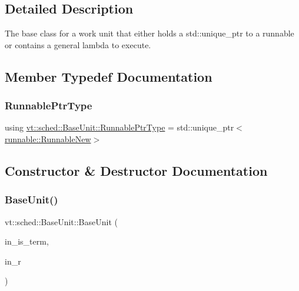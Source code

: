 \subsection{Detailed Description}
The base class for a work unit that either holds a {\ttfamily std\+::unique\+\_\+ptr} to a runnable or contains a general lambda to execute. 

\subsection{Member Typedef Documentation}
\mbox{\label{structvt_1_1sched_1_1_base_unit_a9be5d5adaeb011c8ef82f751485ebf9a}} 
\subsubsection{\texorpdfstring{Runnable\+Ptr\+Type}{RunnablePtrType}}
{\footnotesize\ttfamily using \hyperlink{structvt_1_1sched_1_1_base_unit_a9be5d5adaeb011c8ef82f751485ebf9a}{vt\+::sched\+::\+Base\+Unit\+::\+Runnable\+Ptr\+Type} =  std\+::unique\+\_\+ptr$<$\hyperlink{structvt_1_1runnable_1_1_runnable_new}{runnable\+::\+Runnable\+New}$>$}



\subsection{Constructor \& Destructor Documentation}
\mbox{\label{structvt_1_1sched_1_1_base_unit_a4223dce0bcccbb989eb49106d2e37abe}} 
\subsubsection{\texorpdfstring{Base\+Unit()}{BaseUnit()}\hspace{0.1cm}{\footnotesize\ttfamily [1/2]}}
{\footnotesize\ttfamily vt\+::sched\+::\+Base\+Unit\+::\+Base\+Unit (\begin{DoxyParamCaption}\item[{bool}]{in\+\_\+is\+\_\+term,  }\item[{\hyperlink{structvt_1_1sched_1_1_base_unit_a9be5d5adaeb011c8ef82f751485ebf9a}{Runnable\+Ptr\+Type}}]{in\+\_\+r }\end{DoxyParamCaption})\hspace{0.3cm}{\ttfamily [inline]}}



